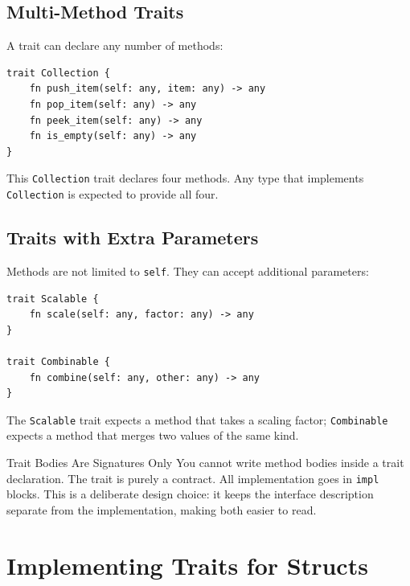 \subsection{Multi-Method Traits}

A trait can declare any number of methods:

\begin{lstlisting}[language=Lattice, caption={A trait with multiple methods}]
trait Collection {
    fn push_item(self: any, item: any) -> any
    fn pop_item(self: any) -> any
    fn peek_item(self: any) -> any
    fn is_empty(self: any) -> any
}
\end{lstlisting}

This \lstinline|Collection| trait declares four methods. Any type that
implements \lstinline|Collection| is expected to provide all four.

\subsection{Traits with Extra Parameters}

Methods are not limited to \lstinline|self|. They can accept additional
parameters:

\begin{lstlisting}[language=Lattice, caption={Traits with extra parameters}]
trait Scalable {
    fn scale(self: any, factor: any) -> any
}

trait Combinable {
    fn combine(self: any, other: any) -> any
}
\end{lstlisting}

The \lstinline|Scalable| trait expects a method that takes a scaling factor;
\lstinline|Combinable| expects a method that merges two values of the same
kind.

\begin{notebox}{Trait Bodies Are Signatures Only}
You cannot write method bodies inside a trait declaration. The trait is
purely a contract. All implementation goes in \lstinline|impl| blocks.
This is a deliberate design choice: it keeps the interface description
separate from the implementation, making both easier to read.
\end{notebox}

\section{Implementing Traits for Structs}\label{sec:trait-implementing}

